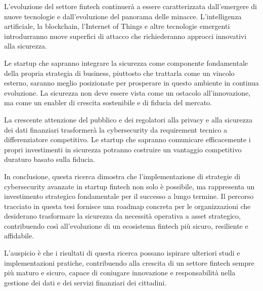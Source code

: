 L'evoluzione del settore fintech continuerà a essere caratterizzata dall'emergere di nuove tecnologie e dall'evoluzione del panorama delle minacce. L'intelligenza artificiale, la blockchain, l'Internet of Things e altre tecnologie emergenti introdurranno nuove superfici di attacco che richiederanno approcci innovativi alla sicurezza.

Le startup che sapranno integrare la sicurezza come componente fondamentale della propria strategia di business, piuttosto che trattarla come un vincolo esterno, saranno meglio posizionate per prosperare in questo ambiente in continua evoluzione. La sicurezza non deve essere vista come un ostacolo all'innovazione, ma come un enabler di crescita sostenibile e di fiducia del mercato.

La crescente attenzione del pubblico e dei regolatori alla privacy e alla sicurezza dei dati finanziari trasformerà la cybersecurity da requirement tecnico a differenziatore competitivo. Le startup che sapranno comunicare efficacemente i propri investimenti in sicurezza potranno costruire un vantaggio competitivo duraturo basato sulla fiducia.

In conclusione, questa ricerca dimostra che l'implementazione di strategie di cybersecurity avanzate in startup fintech non solo è possibile, ma rappresenta un investimento strategico fondamentale per il successo a lungo termine. Il percorso tracciato in questa tesi fornisce una roadmap concreta per le organizzazioni che desiderano trasformare la sicurezza da necessità operativa a asset strategico, contribuendo così all'evoluzione di un ecosistema fintech più sicuro, resiliente e affidabile.

L'auspicio è che i risultati di questa ricerca possano ispirare ulteriori studi e implementazioni pratiche, contribuendo alla crescita di un settore fintech sempre più maturo e sicuro, capace di coniugare innovazione e responsabilità nella gestione dei dati e dei servizi finanziari dei cittadini.
